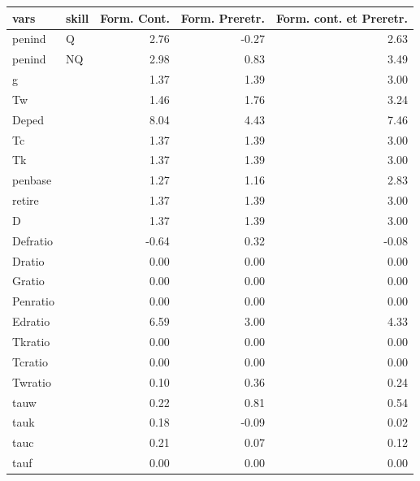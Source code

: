 \begin{tabular}{llrrr}
  \hline
vars & skill & Form. Cont. & Form. Preretr. & Form. cont. et Preretr. \\ 
  \hline
penind & Q & 2.76 & -0.27 & 2.63 \\ 
  penind & NQ & 2.98 & 0.83 & 3.49 \\ 
  g &  & 1.37 & 1.39 & 3.00 \\ 
  Tw &  & 1.46 & 1.76 & 3.24 \\ 
  Deped &  & 8.04 & 4.43 & 7.46 \\ 
  Tc &  & 1.37 & 1.39 & 3.00 \\ 
  Tk &  & 1.37 & 1.39 & 3.00 \\ 
  penbase &  & 1.27 & 1.16 & 2.83 \\ 
  retire &  & 1.37 & 1.39 & 3.00 \\ 
  D &  & 1.37 & 1.39 & 3.00 \\ 
  Defratio &  & -0.64 & 0.32 & -0.08 \\ 
  Dratio &  & 0.00 & 0.00 & 0.00 \\ 
  Gratio &  & 0.00 & 0.00 & 0.00 \\ 
  Penratio &  & 0.00 & 0.00 & 0.00 \\ 
  Edratio &  & 6.59 & 3.00 & 4.33 \\ 
  Tkratio &  & 0.00 & 0.00 & 0.00 \\ 
  Tcratio &  & 0.00 & 0.00 & 0.00 \\ 
  Twratio &  & 0.10 & 0.36 & 0.24 \\ 
  tauw &  & 0.22 & 0.81 & 0.54 \\ 
  tauk &  & 0.18 & -0.09 & 0.02 \\ 
  tauc &  & 0.21 & 0.07 & 0.12 \\ 
  tauf &  & 0.00 & 0.00 & 0.00 \\ 
   \hline
\end{tabular}
